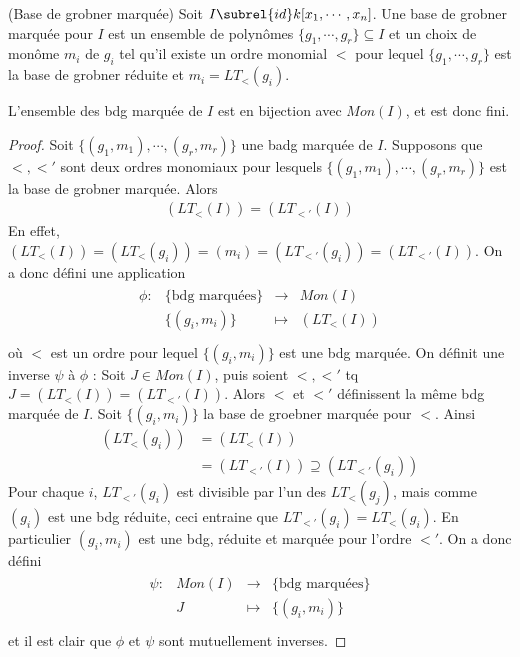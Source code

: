         \begin{defi} (Base de grobner marquée)
            Soit $I \subrel{id} k[x_1, \cdots, x_n]$. Une base de grobner marquée pour $I$ est un ensemble de polynômes $\{g_1, \cdots, g_r\} \subseteq I$ et un choix de monôme $m_i$ de $g_i$ tel qu'il existe un ordre monomial $<$ pour lequel $\{g_1, \cdots, g_r\}$ est la base de grobner réduite et $m_i = LT_<(g_i)$.
        \end{defi}
        \begin{coro}
            L'ensemble des bdg marquée de $I$ est en bijection avec $Mon(I)$, et est donc fini.
        \end{coro}
        \begin{proof}
            Soit $\{(g_1,m_1), \cdots, (g_r,m_r)\}$ une badg marquée de $I$. Supposons que $<, <'$ sont deux ordres monomiaux pour lesquels $\{(g_1, m_1), \cdots, (g_r, m_r)\}$ est la base de grobner marquée. Alors
            \begin{align*}
                (LT_<(I)) = (LT_{<'}(I))
            \end{align*}
            En effet, $(LT_<(I)) = (LT_<(g_i)) = (m_i) = (LT_{<'}(g_i)) = (LT_{<'}(I))$. On a donc défini une application
            \begin{align*}
                \begin{array}{cccc}
                    \phi : & \{\text{bdg marquées}\} & \to & Mon(I) \\
                    & \{(g_i,m_i)\} & \mapsto & (LT_<(I)) \\
                \end{array}
            \end{align*}
            où $<$ est un ordre pour lequel $\{(g_i, m_i)\}$ est une bdg marquée. On définit une inverse $\psi$ à $\phi$ : Soit $J \in Mon(I)$, puis soient $<, <'$ tq $J = (LT_<(I)) = (LT_{<'}(I))$. Alors $<$ et $<'$ définissent la même bdg marquée de $I$. Soit $\{(g_i,m_i)\}$ la base de groebner marquée pour $<$. Ainsi
            \begin{align*}
                (LT_<(g_i)) &= (LT_<(I)) \\
                &= (LT_{<'}(I)) \supseteq (LT_{<'}(g_i))
            \end{align*}
            Pour chaque $i$, $LT_{<'}(g_i)$ est divisible par l'un des $LT_<(g_j)$, mais comme $(g_i)$ est une bdg réduite, ceci entraine que $LT_{<'}(g_i) = LT_<(g_i)$. En particulier $(g_i, m_i)$ est une bdg, réduite et marquée pour l'ordre $<'$. On a donc défini
            \begin{align*}
                \begin{array}{cccc}
                    \psi : & Mon(I) & \to & \{\text{bdg marquées}\} \\
                    & J & \mapsto & \{(g_i, m_i)\}\\
                \end{array}
            \end{align*}
            et il est clair que $\phi$ et $\psi$ sont mutuellement inverses.
        \end{proof}
